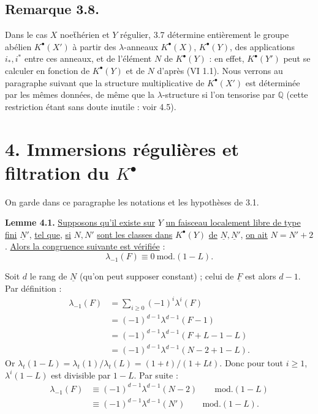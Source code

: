 
\subsection*{Remarque 3.8.}

Dans le cas \(X\) noe\"{t}hérien et \(Y\) régulier, 3.7 détermine entièrement le groupe abélien \(K^{\bullet}(X')\) à partir des \(\lambda\)-anneaux \(K^{\bullet}(X)\), \(K^{\bullet}(Y)\), des applications \(i_*,i^*\) entre ces anneaux, et de l'élément \(N\) de \(K^{\bullet}(Y)\) : en effet, \(K^{\bullet}(Y')\) peut se calculer en fonction de \(K^{\bullet}(Y)\) et de \(N\) d'après (VI 1.1). Nous verrons au paragraphe suivant que la structure multiplicative de \(K^{\bullet}(X')\) est déterminée par les mêmes données, de même que la \(\lambda\)-structure si l'on tensorise par \(\mathbb Q\) (cette restriction étant sans doute inutile : voir 4.5).

\section*{4. Immersions régulières et filtration du \(K^{\bullet}\)}

On garde dans ce paragraphe les notations et les hypothèses de 3.1.

\textbf{Lemme 4.1.} \uline{Supposons qu'il existe sur} \(Y\) \uline{un faisceau localement libre de type fini} \(\underline{N}'\), \uline{tel que}, \uline{si} \(N,N'\) \uline{sont les classes dans} \(K^{\bullet}(Y)\) \uline{de} \(\underline{N},\underline{N}'\), \uline{on ait} \(N=N'+2\). \uline{Alors la congruence suivante est vérifiée} :
\[
  \lambda_{-1}(F)\equiv 0 \ \mathrm{mod.}(1-L).
\]

Soit \(d\) le rang de \(\underline{N}\) (qu'on peut supposer constant) ; celui de \(\underline{F}\) est alors \(d-1\). Par définition :
\[
\begin{aligned}
\lambda_{-1}(F)
 &= \sum_{i\ge0}(-1)^i\lambda^i(F)\\
 &= (-1)^{d-1}\lambda^{d-1}(F-1)\\
 &= (-1)^{d-1}\lambda^{d-1}(F+L-1-L)\\
 &= (-1)^{d-1}\lambda^{d-1}(N-2+1-L).
\end{aligned}
\]
Or \(\lambda_t(1-L)=\lambda_t(1)/\lambda_t(L)=(1+t)/(1+Lt)\). Donc pour tout \(i\ge1\), \(\lambda^i(1-L)\) est divisible par \(1-L\). Par suite :
\[
\begin{aligned}
\lambda_{-1}(F)
  &\equiv (-1)^{d-1}\lambda^{d-1}(N-2) \qquad\mathrm{mod.}(1-L)\\
  &\equiv(-1)^{d-1}\lambda^{d-1}(N') \qquad\mathrm{mod.}(1-L).
\end{aligned}
\]
